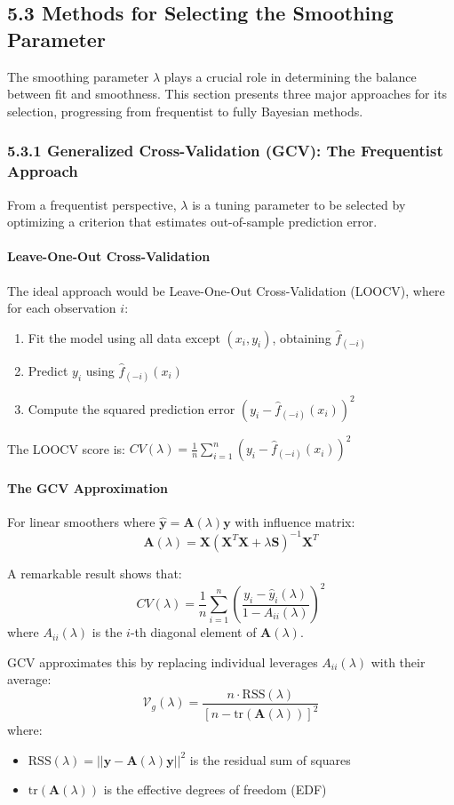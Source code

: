 \documentclass[11pt, a4paper]{article}
\begin{document}
\subsection{5.3 Methods for Selecting the Smoothing Parameter}
The smoothing parameter $\lambda$ plays a crucial role in determining the balance between fit and smoothness. This section presents three major approaches for its selection, progressing from frequentist to fully Bayesian methods.

\subsubsection{5.3.1 Generalized Cross-Validation (GCV): The Frequentist Approach}
From a frequentist perspective, $\lambda$ is a tuning parameter to be selected by optimizing a criterion that estimates out-of-sample prediction error.

\paragraph{Leave-One-Out Cross-Validation}
The ideal approach would be Leave-One-Out Cross-Validation (LOOCV), where for each observation $i$:
\begin{enumerate}
\item Fit the model using all data except $(x_i, y_i)$, obtaining $\hat{f}_{(-i)}$
\item Predict $y_i$ using $\hat{f}_{(-i)}(x_i)$
\item Compute the squared prediction error $(y_i - \hat{f}_{(-i)}(x_i))^2$
\end{enumerate}
The LOOCV score is: $CV(\lambda) = \frac{1}{n} \sum_{i=1}^n (y_i - \hat{f}_{(-i)}(x_i))^2$

\paragraph{The GCV Approximation}
For linear smoothers where $\hat{\mathbf{y}} = \mathbf{A}(\lambda)\mathbf{y}$ with influence matrix:
\[ \mathbf{A}(\lambda) = \mathbf{X}(\mathbf{X}^T\mathbf{X} + \lambda\mathbf{S})^{-1}\mathbf{X}^T \]

A remarkable result shows that:
\[ CV(\lambda) = \frac{1}{n} \sum_{i=1}^n \left( \frac{y_i - \hat{y}_i(\lambda)}{1 - A_{ii}(\lambda)} \right)^2 \]
where $A_{ii}(\lambda)$ is the $i$-th diagonal element of $\mathbf{A}(\lambda)$.

GCV approximates this by replacing individual leverages $A_{ii}(\lambda)$ with their average:
\[ \mathcal{V}_g(\lambda) = \frac{n \cdot \text{RSS}(\lambda)}{[n - \text{tr}(\mathbf{A}(\lambda))]^2} \]
where:
\begin{itemize}
\item $\text{RSS}(\lambda) = ||\mathbf{y} - \mathbf{A}(\lambda)\mathbf{y}||^2$ is the residual sum of squares
\item $\text{tr}(\mathbf{A}(\lambda))$ is the effective degrees of freedom (EDF)
\end{itemize}
\end{document}
